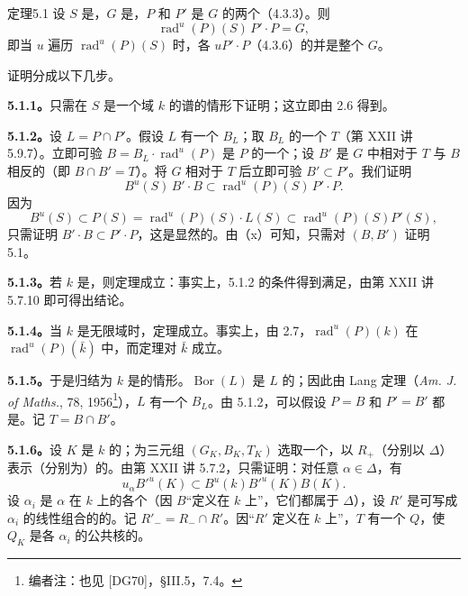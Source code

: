 \begin{SGAresult}{定理}{5.1}
设 $S$ 是，$G$ 是，$P$ 和 $P'$ 是 $G$ 的两个（4.3.3）。则
\[
\operatorname{rad}^{u}(P)(S)\,P'\cdot P=G,
\]
即当 $u$ 遍历 $\operatorname{rad}^{u}(P)(S)$ 时，各 $uP'\cdot P$（4.3.6）的并是整个 $G$。
\end{SGAresult}
证明分成以下几步。

\textbf{5.1.1。}只需在 $S$ 是一个域 $k$ 的谱的情形下证明；这立即由 2.6 得到。

\textbf{5.1.2。}设 $L=P\cap P'$。假设 $L$ 有一个 $B_L$；取 $B_L$ 的一个 $T$（第 XXII 讲 5.9.7）。立即可验 $B=B_L\cdot\operatorname{rad}^{u}(P)$ 是 $P$ 的一个；设 $B'$ 是 $G$ 中相对于 $T$ 与 $B$ 相反的（即 $B\cap B'=T$）。将 $G$ 相对于 $T$ 后立即可验 $B'\subset P'$。我们证明
\[
 B^u(S)\,B'\cdot B\subset\operatorname{rad}^{u}(P)(S)\,P'\cdot P.\tag{x}
\]
因为
\[
 B^u(S)\subset P(S)=\operatorname{rad}^{u}(P)(S)\cdot L(S)
 \subset\operatorname{rad}^{u}(P)(S)P'(S),
\]
只需证明 $B'\cdot B\subset P'\cdot P$，这是显然的。由（x）可知，只需对 $(B,B')$ 证明 5.1。

\textbf{5.1.3。}若 $k$ 是，则定理成立：事实上，5.1.2 的条件得到满足，由第 XXII 讲 5.7.10 即可得出结论。

\textbf{5.1.4。}当 $k$ 是无限域时，定理成立。事实上，由 2.7，$\operatorname{rad}^{u}(P)(k)$ 在 $\operatorname{rad}^{u}(P)(\bar k)$ 中，而定理对 $\bar k$ 成立。

\textbf{5.1.5。}于是归结为 $k$ 是的情形。$\operatorname{Bor}(L)$ 是 $L$ 的；因此由 Lang 定理（\textit{Am. J. of Maths.}, 78, 1956\footnote{编者注：也见 [DG70]，\S III.5，7.4。}），$L$ 有一个 $B_L$。由 5.1.2，可以假设 $P=B$ 和 $P'=B'$ 都是。记 $T=B\cap B'$。

\textbf{5.1.6。}设 $K$ 是 $k$ 的；为三元组 $(G_K,B_K,T_K)$ 选取一个，以 $R_+$（分别以 $\Delta$）表示（分别为）的。由第 XXII 讲 5.7.2，只需证明：对任意 $\alpha\in\Delta$，有
\[
 u_\alpha B'^u(K)\subset B^u(k)B'^u(K)B(K).\tag{1}
\]
设 $\alpha_i$ 是 $\alpha$ 在 $k$ 上的各个（因 $B$“定义在 $k$ 上”，它们都属于 $\Delta$），设 $R'$ 是可写成 $\alpha_i$ 的线性组合的的。记 $R'_- =R_-\cap R'$。因“$R'$ 定义在 $k$ 上”，$T$ 有一个 $Q$，使 $Q_K$ 是各 $\alpha_i$ 的公共核的。

